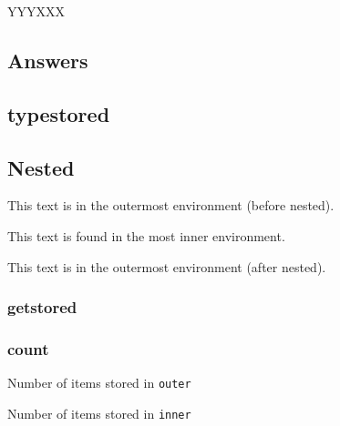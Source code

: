\documentclass{article}
\begin{document}

YYYXXX


\begin{exercise}
\end{exercise}

\begin{exercise}
\end{exercise}

\subsection{Answers}
\newenvironment{answer}
  {\refstepcounter{ansNr}\par\noindent Answer~\theansNr:}
  {\par}

\foreachsc[before={\begin{answer}},after={\end{answer}}]{answers}


\subsection{typestored}
\subsection{Nested}

\begin{scontents}[print-env=false, store-env=outer]
This text is in the outermost environment (before nested).
\begin{scontents}[print-env=false, store-env=inner]
This text is found in the most inner environment.
\end{scontents}
This text is in the outermost environment (after nested).
\end{scontents}

\subsubsection{getstored}

\par
{}\par

\subsubsection{count}
Number of items stored in  \verb+outer+ \par
Number of items stored in  \verb+inner+ 
\end{document}
